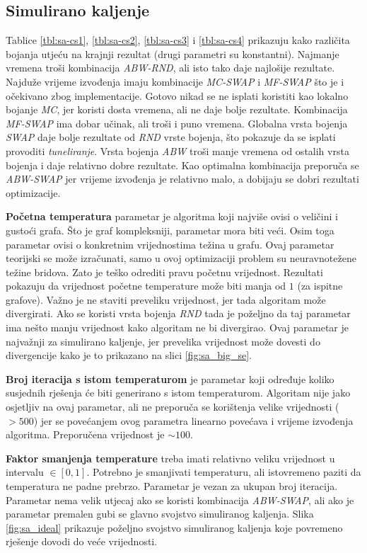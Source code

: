 \documentclass[times, utf8, diplomski, numeric]{fer}
\begin{document}
\subsection{Simulirano kaljenje}

Tablice \ref{tbl:sa-cs1}, \ref{tbl:sa-cs2}, \ref{tbl:sa-cs3} i \ref{tbl:sa-cs4} prikazuju kako različita bojanja utjeću na krajnji rezultat (drugi parametri su konstantni). Najmanje vremena troši kombinacija \emph{ABW-RND}, ali isto tako daje najlošije rezultate. Najduže vrijeme izvođenja imaju kombinacije \emph{MC-SWAP} i \emph{MF-SWAP} što je i očekivano zbog implementacije. Gotovo nikad se ne isplati koristiti kao lokalno bojanje \emph{MC}, jer koristi dosta vremena, ali ne daje bolje rezultate. Kombinacija \emph{MF-SWAP} ima dobar učinak, ali troši i puno vremena. Globalna vrsta bojenja \emph{SWAP} daje bolje rezultate od \emph{RND} vrste bojenja, što pokazuje da se isplati provoditi \emph{tuneliranje}. Vrsta bojenja \emph{ABW} troši manje vremena od ostalih vrsta bojenja i daje relativno dobre rezultate. Kao optimalna kombinacija preporuča se \emph{ABW-SWAP} jer vrijeme izvođenja je relativno malo, a dobijaju se dobri rezultati optimizacije.

\textbf{Početna temperatura} parametar je algoritma koji najviše ovisi o veličini i gustoći grafa. Što je graf kompleksniji, parametar mora biti veći. Osim toga parametar ovisi o konkretnim vrijednostima težina u grafu. Ovaj parametar teorijski se može izračunati, samo u ovoj optimizaciji problem su neuravnotežene težine bridova. Zato je teško odrediti pravu početnu vrijednost. Rezultati pokazuju da vrijednost početne temperature može biti manja od $1$ (za ispitne grafove). Važno je ne staviti preveliku vrijednost, jer tada algoritam može divergirati. Ako se koristi vrsta bojenja \emph{RND} tada je poželjno da taj parametar ima nešto manju vrijednost kako algoritam ne bi divergirao. Ovaj parametar je najvažnji za simulirano kaljenje, jer prevelika vrijednost može dovesti do divergencije kako je to prikazano na slici \ref{fig:sa_big_se}.

\textbf{Broj iteracija s istom temperaturom} je parametar koji određuje koliko susjednih rješenja će biti generirano s istom temperaturom. Algoritam nije jako osjetljiv na ovaj parametar, ali ne preporuča se korištenja velike vrijednosti ($>500$) jer se povećanjem ovog parametra linearno povećava i vrijeme izvođenja algoritma. Preporučena vrijednost je $\sim 100$.

\textbf{Faktor smanjenja temperature} treba imati relativno veliku vrijednost u intervalu $\in[0,1]$. Potrebno je smanjivati temperaturu, ali istovremeno paziti da temperatura ne padne prebrzo. Parametar je vezan za ukupan broj iteracija. Parametar nema velik utjecaj ako se koristi kombinacija \emph{ABW-SWAP}, ali ako je parametar premalen gubi se glavno svojstvo simuliranog kaljenja. Slika \ref{fig:sa_ideal} prikazuje poželjno svojstvo simuliranog kaljenja koje povremeno rješenje dovodi do veće vrijednosti.
\end{document}
